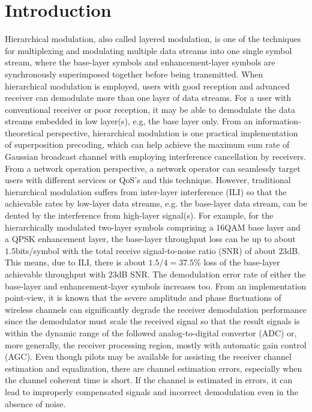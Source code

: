 \documentclass[conference]{IEEEtran}
\begin{document}
\section{Introduction}
Hierarchical modulation, also called layered modulation, is one of
the techniques for multiplexing and modulating multiple data
streams into one single symbol stream, where the base-layer
symbols and enhancement-layer symbols are synchronously
superimposed together before being transmitted. When hierarchical
modulation is employed, users with good reception and advanced
receiver can demodulate more than one layer of data streams. For a
user with conventional receiver or poor reception, it may be able
to demodulate the data streams embedded in low layer(s), e.g, the
base layer only. From an information-theoretical perspective,
hierarchical modulation is one practical implementation of
superposition precoding, which can help achieve the maximum sum
rate of Gaussian broadcast channel with employing interference
cancellation by receivers. From a network operation perspective, a
network operator can seamlessly target users with different
services or QoS's and this technique. However, traditional
hierarchical modulation suffers from inter-layer interference
(ILI) so that the achievable rates by low-layer data streams, e.g.
the base-layer data stream, can be dented by the interference from
high-layer signal(s). For example, for the hierarchically
modulated two-layer symbols comprising a 16QAM base layer and a
QPSK enhancement layer, the base-layer throughput loss can be up
to about $1.5$bits/symbol with the total receive signal-to-noise
ratio (SNR) of about $23$dB. This means, due to ILI, there is
about $1.5/4 = 37.5\%$ loss of the base-layer achievable
throughput with $23$dB SNR. The demodulation error rate of either
the base-layer and enhancement-layer symbols increases too. From
an implementation point-view, it is known that the severe
amplitude and phase fluctuations of wireless channels can
significantly degrade the receiver demodulation performance since
the demodulator must scale the received signal so that the result
signals is within the dynamic range of the followed
analog-to-digital convertor (ADC) or, more generally, the receiver
processing region, mostly with automatic gain control (AGC). Even
though pilots may be available for assisting the receiver channel
estimation and equalization, there are channel estimation errors,
especially when the channel coherent time is short. If the channel
is estimated in errors, it can lead to improperly compensated
signals and incorrect demodulation even in the absence of noise.
\end{document}
